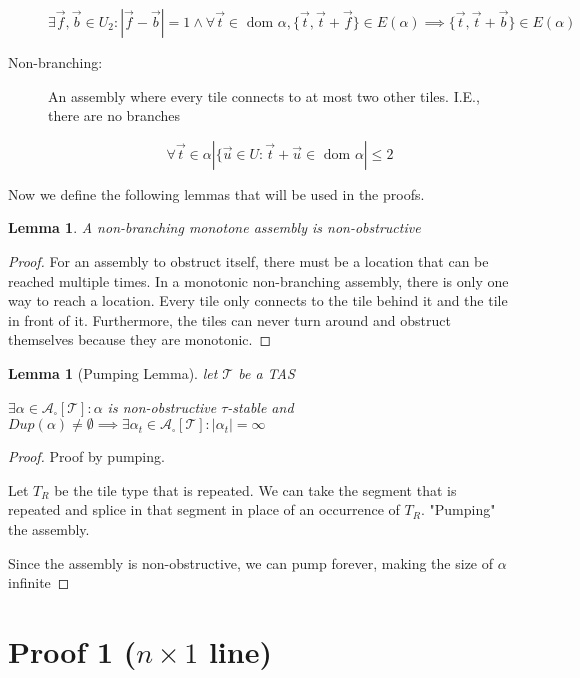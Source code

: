\documentclass[12pt]{article}
\newtheorem{lemma}[theorem]{Lemma}
\begin{document}
\begin{description}
        $\exists \vec{f}, \vec{b} \in U_2 : | \vec{f} - \vec{b} | = 1 \land \forall \vec{t} \in \text{ dom } \alpha, \{\vec{t},\vec{t}+\vec{f}\} \in E(\alpha) \implies \{\vec{t}, \vec{t}+\vec{b}\} \in E(\alpha)$

    \item[Non-branching:] An assembly where every tile connects to at most two other tiles. I.E., there are no branches

        $$ \forall \vec{t} \in \alpha |\{\vec{u} \in U : \vec{t} + \vec{u} \in \text { dom } \alpha | \leq 2 $$


\end{description}


Now we define the following lemmas that will be used in the proofs.

\begin{lemma}
    A non-branching monotone assembly is non-obstructive
\end{lemma}

\begin{proof}
    For an assembly to obstruct itself, there must be a location that can be reached multiple times. In a monotonic non-branching assembly, there is only one way to reach a location. Every tile only connects to the tile behind it and the tile in front of it. Furthermore, the tiles can never turn around and obstruct themselves because they are monotonic.
\end{proof}


\begin{lemma}[Pumping Lemma] 

    let $\mathcal{T}$ be a TAS

    $\exists \alpha \in \mathcal{A}_\square[\mathcal{T}] : \alpha$ is non-obstructive $\tau$-stable and $Dup(\alpha) \ne \emptyset \implies \exists \alpha_t \in \mathcal{A}_\square[\mathcal{T}] : |\alpha_t| = \infty$
\end{lemma}

\begin{proof}
    Proof by pumping. 

    Let $T_R$ be the tile type that is repeated. We can take the segment that is repeated and splice in that segment in place of an occurrence of $T_R$. "Pumping" the assembly. 

    Since the assembly is non-obstructive, we can pump forever, making the size of $\alpha$ infinite 
\end{proof}

\section*{Proof 1 ($n \times 1 $ line)}
\end{document}
